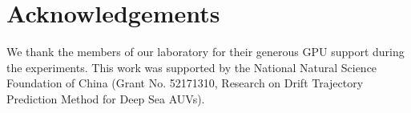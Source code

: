 \documentclass[a4paper]{llncs}
\begin{document}

\clearpage
\section*{Acknowledgements}
We thank the members of our laboratory for their generous GPU support during the experiments. This work was supported by the National Natural Science Foundation of China (Grant No. 52171310, Research on Drift Trajectory Prediction Method for Deep Sea AUVs).

\small\setlength{\itemsep}{0pt}


\enlargethispage{12\baselineskip}
\end{document}
